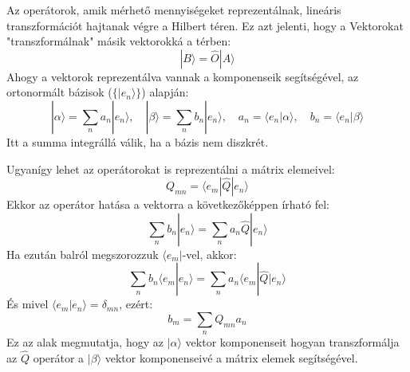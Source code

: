 \documentclass[../main.tex]{subfiles}
\begin{document}
Az operátorok, amik mérhető mennyiségeket reprezentálnak, lineáris transzformációt hajtanak végre a Hilbert téren. Ez azt jelenti, hogy a Vektorokat "transzformálnak" másik vektorokká a térben:
\begin{equation}
    | B \rangle = \hat{O} | A \rangle
\end{equation}
Ahogy a vektorok reprezentálva vannak a komponenseik segítségével, az ortonormált bázisok ($\{|e_n\rangle\}$) alapján:
\begin{equation}
    | \alpha \rangle = \sum_n a_n | e_n \rangle, \quad |\beta \rangle = \sum_n b_n | e_n \rangle, \quad a_n = \langle e_n | \alpha \rangle, \quad b_n = \langle e_n | \beta \rangle
\end{equation}
Itt a summa integrállá válik, ha a bázis nem diszkrét.

Ugyanígy lehet az operátorokat is reprezentálni a mátrix elemeivel:
\begin{equation}
    Q_{mn} = \langle e_m | \hat{Q} | e_n \rangle
\end{equation}
Ekkor az operátor hatása a vektorra a következőképpen írható fel:
\begin{equation}
    \sum_n b_n |e_n\rangle = \sum_n a_n \hat{Q} | e_n \rangle
\end{equation}
Ha ezután balról megszorozzuk $\langle e_m |$-vel, akkor:
\begin{equation}
    \sum_n b_n \langle e_m | e_n \rangle = \sum_n a_n \langle e_m | \hat{Q} | e_n \rangle
\end{equation}
És mivel $\langle e_m | e_n \rangle = \delta_{mn}$, ezért:
\begin{equation}
    b_m = \sum_n Q_{mn} a_n
\end{equation}
Ez az alak megmutatja, hogy az $|\alpha \rangle$ vektor komponenseit hogyan transzformálja az $\hat{Q}$ operátor a $|\beta \rangle$ vektor komponenseivé a mátrix elemek segítségével.
\end{document}

